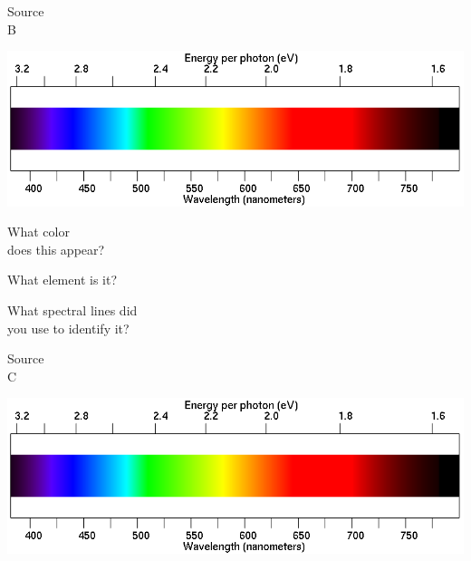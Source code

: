 \documentclass[11pt]{article}
\begin{document}
\vspace{1in}

\begin{minipage}{0.1\textwidth}
	\begin{center}
		\Large Source \\ B
	\end{center}
\end{minipage}
\begin{minipage}{0.7\textwidth}
	\includegraphics[width=\textwidth]{spectrum2.png}
\end{minipage}

\begin{minipage}{0.33\textwidth}
	What color \\does this appear?
\end{minipage}
\begin{minipage}{0.33\textwidth}
	What element is it?
\end{minipage}
\begin{minipage}{0.33\textwidth}
	What spectral lines did\\
	you use to identify it?
\end{minipage}

\vspace{1in}
\begin{minipage}{0.1\textwidth}
	\begin{center}
		\Large Source \\ C
	\end{center}
\end{minipage}
\begin{minipage}{0.7\textwidth}
	\includegraphics[width=\textwidth]{spectrum2.png}
\end{minipage}
\end{document}

